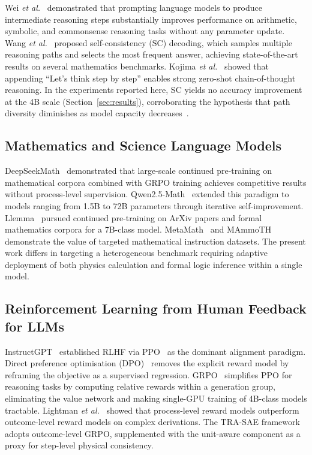 \documentclass{ieeeaccess}
\newcommand{\modelname}{\textsc{TRA-SAE}}
\begin{document}
Wei \emph{et al.}~\cite{b1} demonstrated that prompting language models
to produce intermediate reasoning steps substantially improves performance
on arithmetic, symbolic, and commonsense reasoning tasks without any
parameter update.
Wang \emph{et al.}~\cite{b2} proposed self-consistency (SC) decoding,
which samples multiple reasoning paths and selects the most frequent answer,
achieving state-of-the-art results on several mathematics benchmarks.
Kojima \emph{et al.}~\cite{b3} showed that appending ``Let's think step
by step'' enables strong zero-shot chain-of-thought reasoning.
In the experiments reported here, SC yields no accuracy improvement at the
4B scale (Section~\ref{sec:results}), corroborating the hypothesis that
path diversity diminishes as model capacity decreases~\cite{b24}.

\subsection{Mathematics and Science Language Models}

DeepSeekMath~\cite{b4} demonstrated that large-scale continued
pre-training on mathematical corpora combined with GRPO training achieves
competitive results without process-level supervision.
Qwen2.5-Math~\cite{b5} extended this paradigm to models ranging from
1.5B to 72B parameters through iterative self-improvement.
Llemma~\cite{b6} pursued continued pre-training on ArXiv papers and
formal mathematics corpora for a 7B-class model.
MetaMath~\cite{b20} and MAmmoTH~\cite{b21} demonstrate the value of
targeted mathematical instruction datasets.
The present work differs in targeting a heterogeneous benchmark requiring
adaptive deployment of both physics calculation and formal logic inference
within a single model.

\subsection{Reinforcement Learning from Human Feedback for LLMs}

InstructGPT~\cite{b8} established RLHF via PPO~\cite{b9} as the dominant
alignment paradigm.
Direct preference optimisation (DPO)~\cite{b10} removes the explicit
reward model by reframing the objective as a supervised regression.
GRPO~\cite{b4} simplifies PPO for reasoning tasks by computing relative
rewards within a generation group, eliminating the value network and
making single-GPU training of 4B-class models tractable.
Lightman \emph{et al.}~\cite{b11} showed that process-level reward models
outperform outcome-level reward models on complex derivations.
The \modelname{} framework adopts outcome-level GRPO, supplemented with
the unit-aware component as a proxy for step-level physical consistency.
\end{document}
